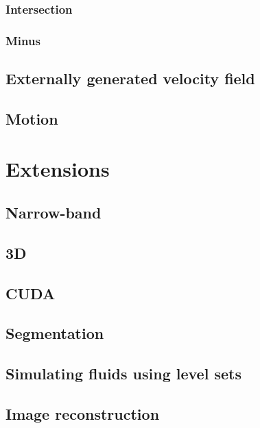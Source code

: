 \documentclass[a4paper, oneside]{memoir}
\begin{document}
\subsection{Intersection}
\subsection{Minus}

\section{Externally generated velocity field}
%
\label{sec:extVel}

\section{Motion}


\chapter{Extensions}
\label{chap:extensions}

\section{Narrow-band}
\label{sec:narrowband}


\section{3D}
\label{sec:3d}

\section{CUDA}
\label{sec:cuda}


\section{Segmentation}
\label{sec:segmentation}


\section{Simulating fluids using level sets}

\label{sec:fluid}

\section{Image reconstruction}
\label{sec:imagereconstruction}

\appendix

\newpage




\end{document}
